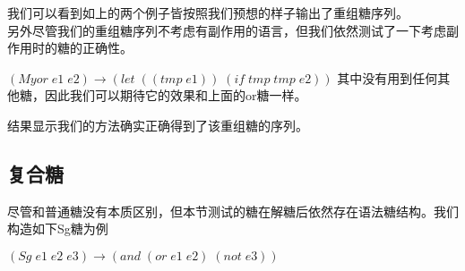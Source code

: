 我们可以看到如上的两个例子皆按照我们预想的样子输出了重组糖序列。\\[6pt]

另外尽管我们的重组糖序列不考虑有副作用的语言，但我们依然测试了一下考虑副作用时的糖的正确性。

$(Myor\;e1\;e2)→(let\;((tmp\;e1))\;(if\;tmp\;tmp\;e2))$
其中没有用到任何其他糖，因此我们可以期待它的效果和上面的or糖一样。

\begin{center}
\end{center}
结果显示我们的方法确实正确得到了该重组糖的序列。

\subsection{复合糖}

尽管和普通糖没有本质区别，但本节测试的糖在解糖后依然存在语法糖结构。我们构造如下Sg糖为例

$(Sg\;e1\;e2\;e3)→(and\;(or\;e1\;e2)\;(not\;e3))$

\begin{center}
\end{center}


